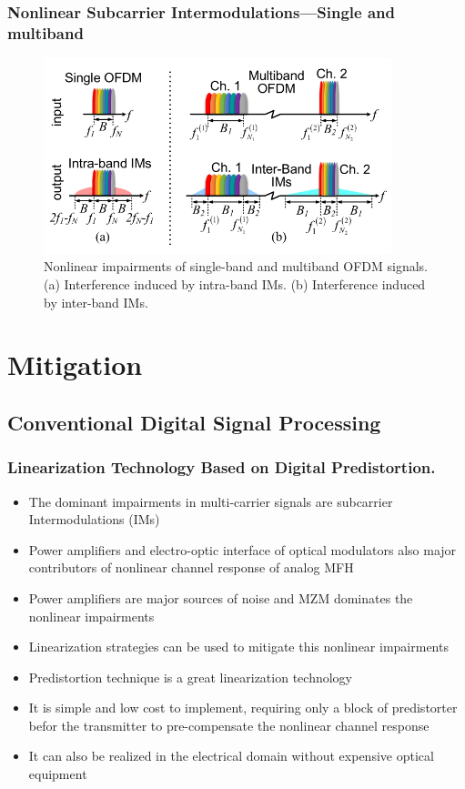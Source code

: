 \documentclass[t]{beamer}
\begin{document}
\begin{frame}
    \frametitle{Nonlinear Subcarrier Intermodulations---Single and multiband~\cite{Wang2017}}
    \begin{figure}[h]
        \includegraphics[width=0.9\textwidth]{single-and-multiband-IM.PNG}
        \caption{Nonlinear impairments of single-band and multiband OFDM signals. (a) Interference induced by intra-band IMs. (b) Interference induced by inter-band IMs.}
        
    \end{figure}
    
\end{frame}

\section{Mitigation}
\subsection{Conventional Digital Signal Processing}

\begin{frame}
    \frametitle{Linearization Technology Based on Digital Predistortion.}
    \begin{itemize}
        \item The dominant impairments in multi-carrier signals are subcarrier Intermodulations (IMs)
        \item Power amplifiers and electro-optic interface of optical modulators also major contributors of nonlinear channel response of analog MFH
        \item Power amplifiers are major sources of noise and MZM dominates the nonlinear impairments
        \item Linearization strategies can be used to mitigate this nonlinear impairments
        \item Predistortion technique is a great linearization technology 
        \item It is simple and low cost to implement, requiring only a block of predistorter befor the transmitter to pre-compensate the nonlinear channel response
        \item It can also be realized in the electrical domain without expensive optical equipment
    \end{itemize}
\end{frame}
\end{document}
